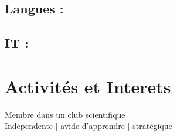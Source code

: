 \documentclass[a4paper]{moderncv}
\begin{document}
\subsection{\textbf{Langues :}}
\subsection{\textbf{IT :}} 
\cvlistitem {\LaTeX}		
\vspace{0.7cm}	
\section{Activités et Interets}
 Membre dans un club scientifique \\
 Independente | avide d'apprendre | stratégique
 
 
\end{document}
